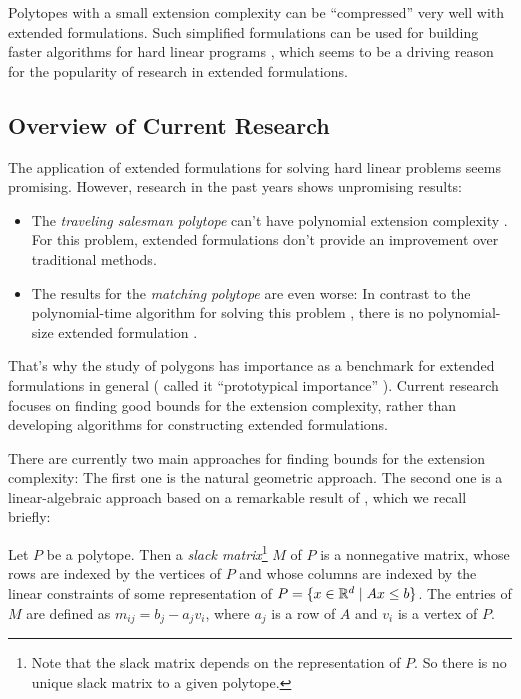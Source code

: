 Polytopes with a small extension complexity can be ``compressed'' very well with extended formulations.
Such simplified formulations can be used for building faster algorithms for hard linear programs \cite{yannakakis1991expressing}, which seems to be a driving reason for the popularity of research in extended formulations.


\subsection{Overview of Current Research}

The application of extended formulations for solving hard linear problems seems promising. However, research in the past years shows unpromising results:

\begin{itemize}
  \item The \emph{traveling salesman polytope} can't have polynomial extension complexity \cite{fiorini2015exponential}. For this problem, extended formulations don't provide an improvement over traditional methods.
  \item The results for the \emph{matching polytope} are even worse: In contrast to the polynomial-time algorithm for solving this problem \cite{ford1956maximal}, there is no polynomial-size extended formulation \cite{rothvoss2017matching}.
\end{itemize}

That's why the study of polygons has importance as a benchmark for extended formulations in general (\citeauthor{braun2015matching} called it ``prototypical importance'' \cite{braun2015matching}).
Current research focuses on finding good bounds for the extension complexity, rather than developing algorithms for constructing extended formulations.

There are currently two main approaches for finding bounds for the extension complexity: The first one is the natural geometric approach. The second one is a linear-algebraic approach based on a remarkable result of \textcite{yannakakis1991expressing}, which we recall briefly:

\begin{definition}
  Let $P$ be a polytope.
  Then a \emph{slack matrix}\footnote{Note that the slack matrix depends on the representation of $P$. So there is no unique slack matrix to a given polytope.} $M$ of $P$ is a nonnegative matrix, whose rows are indexed by the vertices of $P$ and whose columns are indexed by the linear constraints of some representation of $P=\{x \in \mathbb{R}^d \mid Ax \leq b\}$.
  The entries of $M$ are defined as $m_{ij} = b_j - a_j v_i$, where $a_j$ is a row of $A$ and $v_i$ is a vertex of $P$.
\end{definition}

